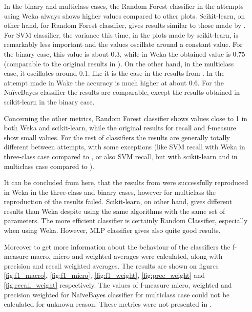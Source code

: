 In the binary and multiclass cases, the Random Forest classifier in the attempts using Weka always shows higher values compared to other plots. Scikit-learn, on other hand, for Random Forest classifier, gives results similar to those made by \cite{borges_hink_machine_2014-1}. For SVM classifier, the variance this time, in the plots made by scikit-learn, is remarkably less important and the values oscillate around a constant value. For the binary case, this value is about 0.3, while in Weka the obtained value is 0.75 (comparable to the original results in \cite{borges_hink_machine_2014-1}). On the other hand, in the multiclass case, it oscillates around 0.1, like it is the case in the results from \cite{borges_hink_machine_2014-1}. In the attempt made in Wake the accuracy is much higher at about 0.6. For the NaïveBayes classifier the results are comparable, except the results obtained in scikit-learn in the binary case.

Concerning the other metrics, Random Forest classifier shows values close to 1 in both Weka and scikit-learn, while the original results for recall and f-measure show small values. For the rest of classifiers the results are generally totally different between attempts, with some exceptions (like SVM recall with Weka in three-class case compared to \cite{borges_hink_machine_2014-1}, or also SVM recall, but with scikit-learn and in multiclass case compared to \cite{borges_hink_machine_2014-1}).

It can be concluded from here, that the results from \cite{borges_hink_machine_2014-1} were successfully reproduced in Weka in the three-class and binary cases, however for multiclass the reproduction of the results failed. Scikit-learn, on other hand, gives different results than Weka despite using the same algorithms with the same set of parameters. The more efficient classifier is certainly Random Classifier, especially when using Weka. However, MLP classifier gives also quite good results.

Moreover to get more information about the behaviour of the classifiers the f-measure macro, micro and weighted averages were calculated, along with precision and recall weighted averages. The results are shown on figures \ref{fig:f1_macro}, \ref{fig:f1_micro}, \ref{fig:f1_weight}, \ref{fig:prec_weight} and \ref{fig:recall_weight} respectively. The values of f-measure micro, weighted and precision weighted for NaïveBayes classifier for multiclass case could not be calculated for unknown reason. These metrics were not presented in \cite{borges_hink_machine_2014-1}.

